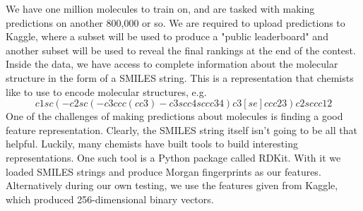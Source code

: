 We have one million molecules to train on, and are tasked with making predictions on another 800,000 or so. We are required to upload predictions to Kaggle, where a subset will be used to produce a "public leaderboard" and another subset will be used to reveal the final rankings at the end of the contest. Inside the data, we have access to complete information about the molecular structure in the form of a SMILES string. This is a representation that chemists like to use to encode molecular structures, e.g.
$$c1sc(-c2sc(-c3ccc(cc3)-c3scc4sccc34)c3[se]ccc23)c2sccc12$$
One of the challenges of making predictions about molecules is finding a good feature representation. Clearly, the SMILES string itself isn't going to be all that helpful. Luckily, many chemists have built tools to build interesting representations. One such tool is a Python package called RDKit. With it we loaded SMILES strings and produce Morgan fingerprints as our features. Alternatively during our own testing, we use the features given from Kaggle, which produced 256-dimensional binary vectors.